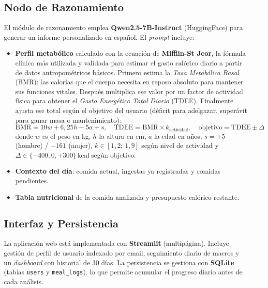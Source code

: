 \documentclass[10pt,a4paper]{article}
\begin{document}
\subsection{Nodo de Razonamiento}

El módulo de razonamiento emplea \textbf{Qwen2.5-7B-Instruct} (HuggingFace) para generar un
informe personalizado en español. El \textit{prompt} incluye:
\begin{itemize}[noitemsep, topsep=2pt]
  \item \textbf{Perfil metabólico} calculado con la ecuación de \textbf{Mifflin-St Jeor}, la
        fórmula clínica más utilizada y validada para estimar el gasto calórico diario a partir de
        datos antropométricos básicos. Primero estima la \textit{Tasa Metabólica Basal} (BMR): las
        calorías que el cuerpo necesita en reposo absoluto para mantener sus funciones vitales.
        Después multiplica ese valor por un factor de actividad física para obtener el
        \textit{Gasto Energético Total Diario} (TDEE). Finalmente ajusta ese total según el
        objetivo del usuario (déficit para adelgazar, superávit para ganar masa o mantenimiento):
        \[
          \text{BMR}=10w+6{,}25h-5a+s, \quad
          \text{TDEE}=\text{BMR}\times k_{\text{actividad}},\quad
          \text{objetivo}=\text{TDEE}\pm\Delta
        \]
        donde $w$ es el peso en kg, $h$ la altura en cm, $a$ la edad en años, $s=+5$ (hombre) /
        $-161$ (mujer), $k\in[1{,}2;\,1{,}9]$ según nivel de actividad
        y $\Delta\in\{-400, 0, +300\}$\,kcal según objetivo.
  \item \textbf{Contexto del día}: comida actual, ingestas ya registradas y comidas pendientes.
  \item \textbf{Tabla nutricional} de la comida analizada y presupuesto calórico restante.
\end{itemize}

\subsection{Interfaz y Persistencia}

La aplicación web está implementada con \textbf{Streamlit} (multipágina). Incluye gestión de perfil
de usuario indexado por email, seguimiento diario de macros y un \textit{dashboard} con historial
de 30 días. La persistencia se gestiona con \textbf{SQLite} (tablas \texttt{users} y
\texttt{meal\_logs}), lo que permite acumular el progreso diario antes de cada análisis.

\end{document}
